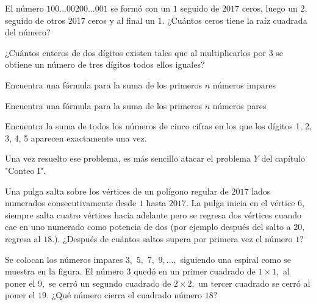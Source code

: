 \begin{problem}
    El número \(100...00200...001\) se formó con un \(1\) 
    seguido de \(2017\) ceros, luego un \(2\), seguido de otros 
    \(2017\) ceros y al final un \(1\). ¿Cuántos ceros tiene 
    la raíz cuadrada del número?
\end{problem}

\begin{problem}
    ¿Cuántos enteros de dos dígitos existen tales que al 
    multiplicarlos por \(3\) se obtiene un número de tres 
    dígitos todos ellos iguales?
\end{problem}

\begin{dproblem}[$3 \clubsuit$]
    Encuentra una fórmula para la suma de los primeros 
    $n$ números impares
\end{dproblem}

\begin{dproblem}[$3 \clubsuit$]
    Encuentra una fórmula para la suma de los primeros 
    $n$ números pares
\end{dproblem}

\begin{problem}[$3 \clubsuit$]
    Encuentra la suma de todos los números de cinco cifras en 
    los que los dígitos 1, 2, 3, 4, 5 aparecen exactamente una 
    vez.
\end{problem}

\begin{remark}
    Una vez resuelto ese problema, es más sencillo atacar 
    el problema $Y$ del capítulo "Conteo I".
\end{remark}

\begin{problem}
    Una pulga salta sobre los vértices de un polígono regular 
    de \(2017\) lados numerados consecutivamente desde \(1\) 
    hasta \(2017\). La pulga inicia en el vértice \(6,\) siempre 
    salta cuatro vértices hacia adelante pero se regresa dos 
    vértices cuando cae en uno numerado como potencia de dos 
    (por ejemplo después del salto a \(20,\) regresa al \(18.\)). 
    ¿Después de cuántos saltos supera por primera vez el número 
    \(1?\)
\end{problem}

\begin{problem}
    Se colocan los números impares \(3,\) \(5,\) \(7,\) 
    \(9,\ldots,\) siguiendo una espiral como se muestra en la 
    figura. El número \(3\) quedó en un primer cuadrado de 
    \(1 \times 1,\) al poner el \(9,\) se cerró un segundo 
    cuadrado de \(2\times 2,\) un tercer cuadrado se cerró al 
    poner el \(19.\) ¿Qué número cierra el cuadrado número \(18?\)
\end{problem}

